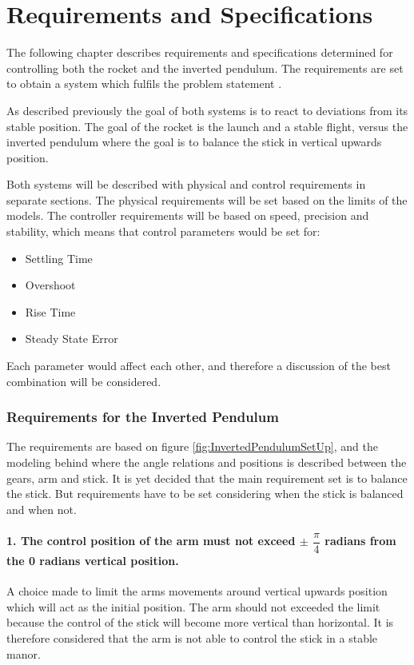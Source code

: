 \chapter{Requirements and Specifications}
The following chapter describes requirements and specifications determined for controlling both the rocket and the inverted pendulum. The requirements are set to obtain a system which fulfils the problem statement .

As described previously the goal of both systems is to react to deviations from its stable position. The goal of the rocket is the launch and a stable flight, versus the inverted pendulum where the goal is to balance the stick in vertical upwards position.  

Both systems will be described with physical and control requirements in separate sections. The physical requirements will be set based on the limits of the models. 
The controller requirements will be based on speed, precision and stability, which means that control parameters would be set for:

\begin{itemize}[noitemsep]
\item Settling Time
\item Overshoot
\item Rise Time
\item Steady State Error
\end{itemize}

Each parameter would affect each other, and therefore a discussion of the best combination will be considered.
\newpage
\subsection{Requirements for the Inverted Pendulum}
The requirements are based on figure \ref{fig:InvertedPendulumSetUp}, and the modeling behind where the angle relations and positions is described between the gears, arm and stick. It is yet decided that the main requirement set is to balance the stick. But requirements have to be set considering when the stick is balanced and when not. 

\setlength{\parindent}{0pt}
\newcommand{\forceindent}{\leavevmode{\parindent=1em\indent}}

\subsubsection*{1. The control position of the arm must not exceed $\pm$ $\dfrac{\pi}{4}$ radians from the 0 radians vertical position.} 
\forceindent A choice made to limit the arms movements around vertical upwards position which will act as the initial position. The arm should not exceeded the limit because the control of the stick will become more vertical than horizontal. It is therefore considered that the arm is not able to control the stick in a stable manor.  


